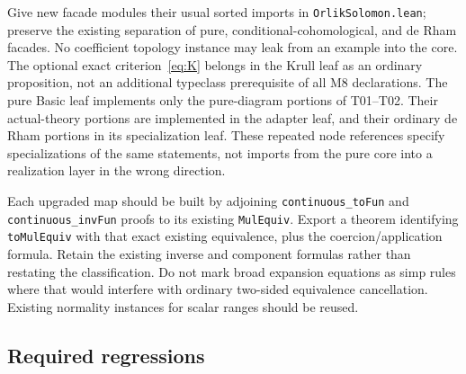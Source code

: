 \documentclass[11pt]{article}
\theoremstyle{remark}\newtheorem{remark}[theorem]{Remark}
\newcommand{\code}[1]{{\normalfont\nolinkurl{#1}}}
\begin{document}
Give new facade modules their usual sorted imports in
\code{OrlikSolomon.lean}; preserve the existing separation of pure,
conditional-cohomological, and de Rham facades. No coefficient topology
instance may leak from an example into the core. The optional exact
criterion~\eqref{eq:K} belongs in the Krull leaf as an ordinary proposition,
not an additional typeclass prerequisite of all M8 declarations.
The pure Basic leaf implements only the pure-diagram portions of
T01--T02. Their actual-theory portions are implemented in the adapter
leaf, and their ordinary de Rham portions in its specialization leaf.
These repeated node references specify specializations of the same
statements, not imports from the pure core into a realization layer
in the wrong direction.

Each upgraded map should be built by adjoining
\code{continuous_toFun} and \code{continuous_invFun} proofs to its
existing \code{MulEquiv}. Export a theorem identifying
\code{toMulEquiv} with that exact existing equivalence, plus the
coercion/application formula. Retain the existing inverse and component
formulas rather than restating the classification. Do not mark broad
expansion equations as simp rules where that would interfere with
ordinary two-sided equivalence cancellation. Existing normality
instances for scalar ranges should be reused.

\subsection{Required regressions}
\end{document}
